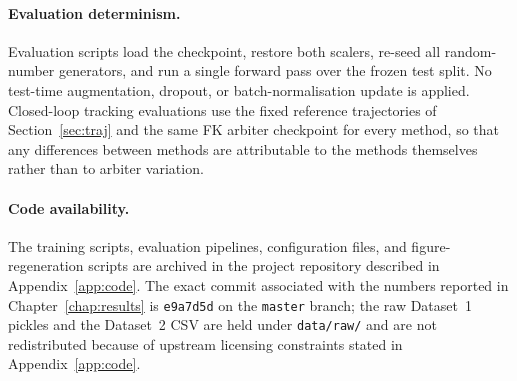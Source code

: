 \paragraph{Evaluation determinism.}
Evaluation scripts load the checkpoint, restore both scalers, re-seed all random-number generators, and run a single forward pass over the frozen test split. No test-time augmentation, dropout, or batch-normalisation update is applied. Closed-loop tracking evaluations use the fixed reference trajectories of Section~\ref{sec:traj} and the same FK arbiter checkpoint for every method, so that any differences between methods are attributable to the methods themselves rather than to arbiter variation.

\paragraph{Code availability.}
The training scripts, evaluation pipelines, configuration files, and figure-regeneration scripts are archived in the project repository described in Appendix~\ref{app:code}. The exact commit associated with the numbers reported in Chapter~\ref{chap:results} is \texttt{e9a7d5d} on the \texttt{master} branch; the raw Dataset~1 pickles and the Dataset~2 CSV are held under \texttt{data/raw/} and are not redistributed because of upstream licensing constraints stated in Appendix~\ref{app:code}.
